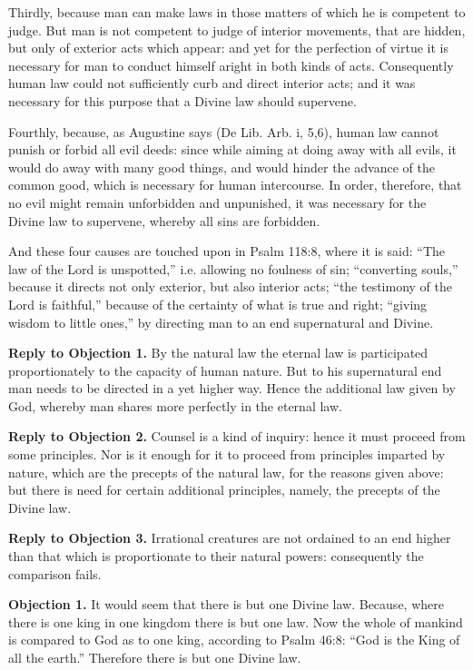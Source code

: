 Thirdly, because man can make laws in those matters of which he is competent to judge. But man is not competent to judge of interior movements, that are hidden, but only of exterior acts which appear: and yet for the perfection of virtue it is necessary for man to conduct himself aright in both kinds of acts. Consequently human law could not sufficiently curb and direct interior acts; and it was necessary for this purpose that a Divine law should supervene.

Fourthly, because, as Augustine says (De Lib. Arb. i, 5,6), human law cannot punish or forbid all evil deeds: since while aiming at doing away with all evils, it would do away with many good things, and would hinder the advance of the common good, which is necessary for human intercourse. In order, therefore, that no evil might remain unforbidden and unpunished, it was necessary for the Divine law to supervene, whereby all sins are forbidden.

And these four causes are touched upon in Psalm 118:8, where it is said: ``The law of the Lord is unspotted,'' i.e. allowing no foulness of sin; ``converting souls,'' because it directs not only exterior, but also interior acts; ``the testimony of the Lord is faithful,'' because of the certainty of what is true and right; ``giving wisdom to little ones,'' by directing man to an end supernatural and Divine.

\textbf{Reply to Objection 1.} By the natural law the eternal law is participated proportionately to the capacity of human nature. But to his supernatural end man needs to be directed in a yet higher way. Hence the additional law given by God, whereby man shares more perfectly in the eternal law.

\textbf{Reply to Objection 2.} Counsel is a kind of inquiry: hence it must proceed from some principles. Nor is it enough for it to proceed from principles imparted by nature, which are the precepts of the natural law, for the reasons given above: but there is need for certain additional principles, namely, the precepts of the Divine law.

\textbf{Reply to Objection 3.} Irrational creatures are not ordained to an end higher than that which is proportionate to their natural powers: consequently the comparison fails.


\textbf{Objection 1.} It would seem that there is but one Divine law. Because, where there is one king in one kingdom there is but one law. Now the whole of mankind is compared to God as to one king, according to Psalm 46:8: ``God is the King of all the earth.'' Therefore there is but one Divine law.

